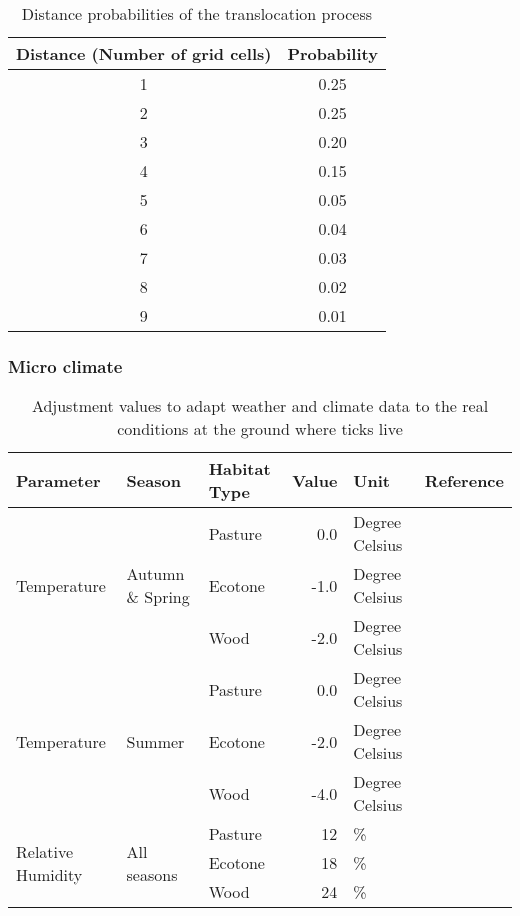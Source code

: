 \documentclass[a4paper, 11pt]{scrartcl}
\begin{document}
\begin{table}[h!]
\caption{Distance probabilities of the translocation process}
\label{tab:distance_probabilities}
\begin{tabular}{@{}cc@{}}
\toprule
\textbf{Distance (Number of grid cells)}	& \textbf{Probability}	\\
\midrule
1 	& 0.25 \\
2	& 0.25 \\
3	& 0.20 \\
4	& 0.15 \\
5	& 0.05 \\
6	& 0.04 \\
7	& 0.03 \\
8	& 0.02 \\
9	& 0.01 \\
\bottomrule
\end{tabular}
\end{table}


\subsubsection{Micro climate}

\begin{table}[h!]
\caption{Adjustment values to adapt weather and climate data to the real conditions at the ground where ticks live}
\label{tab:micro_climate_adjustments}
\begin{tabular}{@{}lllrll@{}}
\toprule
\textbf{Parameter}					& \textbf{Season} 					& \textbf{Habitat Type}  & \textbf{Value}  	& \textbf{Unit} & \textbf{Reference}  	\\
\midrule
\multirow{3}{*}{Temperature} 		& \multirow{3}{*}{Autumn \& Spring} & Pasture 				 &   0.0   			&   Degree Celsius	&            		    \\
									&									& Ecotone 				 &   -1.0 	  		&   Degree Celsius &	    				\\
									&					 				& Wood    				 &   -2.0   		&   Degree Celsius &	    				\\
\midrule
\multirow{3}{*}{Temperature} 		& \multirow{3}{*}{Summer}        	& Pasture 				 &   0.0    		&	Degree Celsius	&          				\\
									&				 	 				& Ecotone 				 &  -2.0    		&  	Degree Celsius	& ~\cite{Geiger.1995}  	\\
									&				 	 				& Wood	   				 &  -4.0    		&  	Degree Celsius	& ~\cite{Bonan.2016}   	\\
\midrule
\multirow{3}{*}{Relative Humidity}  & \multirow{3}{*}{All seasons}      & Pasture 				 &   12   			&  	\%			&            		    \\
									&				 					& Ecotone 				 &   18    			&   \%    		&					    \\
									&				 					& Wood    				 &   24    			&  	\%			& ~\cite{Boehnke.2017} 	\\
\bottomrule
\end{tabular}
\end{table}



\newpage
\printbibliography[heading = bibintoc, title = {Bibliography}]
\end{document}
